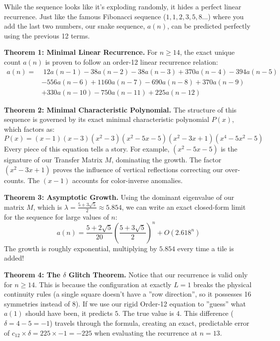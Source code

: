 \documentclass[12pt]{article}
\begin{document}
While the sequence looks like it's exploding randomly, it hides a perfect linear recurrence. Just like the famous Fibonacci sequence ($1, 1, 2, 3, 5, 8...$) where you add the last two numbers, our snake sequence, $a(n)$, can be predicted perfectly using the previous 12 terms.

\textbf{Theorem 1: Minimal Linear Recurrence.} For $n \ge 14$, the exact unique count $a(n)$ is proven to follow an order-12 linear recurrence relation:
\begin{align*}
a(n) = & \; 12a(n-1) - 38a(n-2) - 38a(n-3) + 370a(n-4) - 394a(n-5) \\
& - 556a(n-6) + 1160a(n-7) - 690a(n-8) + 370a(n-9) \\
& + 330a(n-10) - 750a(n-11) + 225a(n-12)
\end{align*}

\textbf{Theorem 2: Minimal Characteristic Polynomial.} The structure of this sequence is governed by its exact minimal characteristic polynomial $P(x)$, which factors as:
\begin{equation}
P(x) = (x-1)(x-3)(x^2-3)(x^2-5x-5)(x^2-3x+1)(x^4-5x^2-5)
\end{equation}
Every piece of this equation tells a story. For example, $(x^2-5x-5)$ is the signature of our Transfer Matrix $M$, dominating the growth. The factor $(x^2-3x+1)$ proves the influence of vertical reflections correcting our over-counts. The $(x-1)$ accounts for color-inverse anomalies. 

\textbf{Theorem 3: Asymptotic Growth.} Using the dominant eigenvalue of our matrix $M$, which is $\lambda = \frac{5 + 3\sqrt{5}}{2} \approx 5.854$, we can write an exact closed-form limit for the sequence for large values of $n$:
\begin{equation}
a(n) = \frac{5 + 2\sqrt{5}}{20} \left( \frac{5 + 3\sqrt{5}}{2} \right)^n + O(2.618^n)
\end{equation}
The growth is roughly exponential, multiplying by $5.854$ every time a tile is added!

\textbf{Theorem 4: The $\delta$ Glitch Theorem.} Notice that our recurrence is valid only for $n \ge 14$. This is because the configuration at exactly $L=1$ breaks the physical continuity rules (a single square doesn't have a ''row direction'', so it possesses 16 symmetries instead of 8). 
If we use our rigid Order-12 equation to ''guess'' what $a(1)$ should have been, it predicts $5$. The true value is $4$. This difference ($\delta = 4-5 = -1$) travels through the formula, creating an exact, predictable error of $c_{12} \times \delta = 225 \times -1 = -225$ when evaluating the recurrence at $n=13$. 
\end{document}
